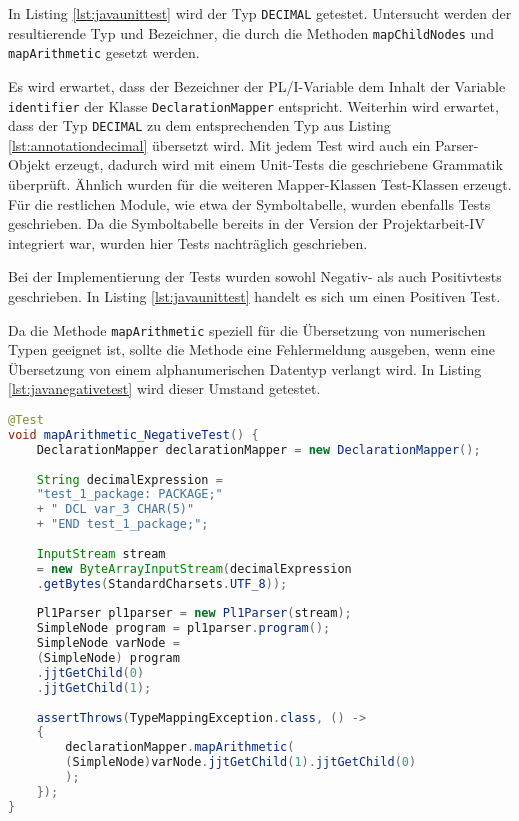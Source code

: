 In Listing \ref{lst:javaunittest}  wird der Typ \verb+DECIMAL+ getestet. Untersucht werden der resultierende Typ und Bezeichner, die durch die Methoden \verb+mapChildNodes+ und \verb+mapArithmetic+ gesetzt werden.

Es wird erwartet, dass der Bezeichner der PL/I-Variable dem Inhalt der Variable \verb+identifier+ der Klasse \verb+DeclarationMapper+ entspricht.
Weiterhin wird erwartet, dass der Typ \verb+DECIMAL+ zu dem entsprechenden Typ aus Listing \ref{lst:annotationdecimal} übersetzt wird.
Mit jedem Test wird auch ein Parser-Objekt erzeugt, dadurch wird  mit einem Unit-Tests die geschriebene Grammatik überprüft.
Ähnlich wurden  für die weiteren Mapper-Klassen Test-Klassen erzeugt.
Für die restlichen Module, wie etwa der Symboltabelle, wurden ebenfalls Tests geschrieben.
Da die Symboltabelle bereits in der Version der Projektarbeit-IV integriert war, wurden hier  Tests nachträglich geschrieben. 

Bei der Implementierung der Tests wurden sowohl Negativ- als auch Positivtests geschrieben.
In Listing \ref{lst:javaunittest} handelt es sich um einen Positiven Test. 

Da die Methode \verb+mapArithmetic+ speziell für die Übersetzung von numerischen Typen geeignet ist, sollte die Methode eine Fehlermeldung ausgeben, wenn eine Übersetzung von einem alphanumerischen Datentyp verlangt wird.  In Listing \ref{lst:javanegativetest} wird dieser Umstand getestet. 

\begin{lstlisting}[language=Java, caption=Arithmetic Node Unit-test, label={lst:javanegativetest}]
@Test
void mapArithmetic_NegativeTest() {
	DeclarationMapper declarationMapper = new DeclarationMapper();
	
	String decimalExpression = 
	"test_1_package: PACKAGE;" 
	+ "	DCL var_3 CHAR(5)" 
	+ "END test_1_package;";
	
	InputStream stream
	= new ByteArrayInputStream(decimalExpression
	.getBytes(StandardCharsets.UTF_8));
		
	Pl1Parser pl1parser = new Pl1Parser(stream);
	SimpleNode program = pl1parser.program();
	SimpleNode varNode = 
	(SimpleNode) program
	.jjtGetChild(0)
	.jjtGetChild(1);
		
	assertThrows(TypeMappingException.class, () -> 
	{
		declarationMapper.mapArithmetic(
		(SimpleNode)varNode.jjtGetChild(1).jjtGetChild(0)
		);
	});
}
\end{lstlisting}

